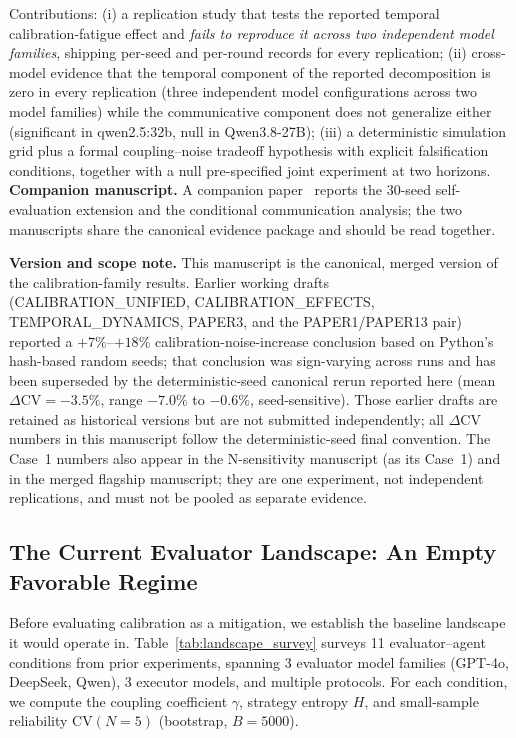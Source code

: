 \documentclass[11pt]{article}
\newcommand{\CV}{\ensuremath{\mathrm{CV}}}
\theoremstyle{definition}
\theoremstyle{remark}
\begin{document}
\noindent Contributions: (i) a replication study that tests the reported temporal calibration-fatigue effect and \emph{fails to reproduce it across two independent model families}, shipping per-seed and per-round records for every replication; (ii) cross-model evidence that the temporal component of the reported decomposition is zero in every replication (three independent model configurations across two model families) while the communicative component does not generalize either (significant in qwen2.5:32b, null in Qwen3.8-27B); (iii) a deterministic simulation grid plus a formal coupling--noise tradeoff hypothesis with explicit falsification conditions, together with a null pre-specified joint experiment at two horizons. \textbf{Companion manuscript.} A companion paper~\citep{companion2026} reports the 30-seed self-evaluation extension and the conditional communication analysis; the two manuscripts share the canonical evidence package and should be read together.

\textbf{Version and scope note.} This manuscript is the canonical, merged version of the calibration-family results. Earlier working drafts (CALIBRATION\_UNIFIED, CALIBRATION\_EFFECTS, TEMPORAL\_DYNAMICS, PAPER3, and the PAPER1/PAPER13 pair) reported a $+7\%$--$+18\%$ calibration-noise-increase conclusion based on Python's hash-based random seeds; that conclusion was sign-varying across runs and has been superseded by the deterministic-seed canonical rerun reported here (mean $\Delta\CV = -3.5\%$, range $-7.0\%$ to $-0.6\%$, seed-sensitive). Those earlier drafts are retained as historical versions but are not submitted independently; all $\Delta\CV$ numbers in this manuscript follow the deterministic-seed final convention. The Case~1 numbers also appear in the N-sensitivity manuscript (as its Case~1) and in the merged flagship manuscript; they are one experiment, not independent replications, and must not be pooled as separate evidence.

\subsection{The Current Evaluator Landscape: An Empty Favorable Regime}

Before evaluating calibration as a mitigation, we establish the baseline landscape it would operate in. Table~\ref{tab:landscape_survey} surveys 11 evaluator--agent conditions from prior experiments, spanning 3 evaluator model families (GPT-4o, DeepSeek, Qwen), 3 executor models, and multiple protocols. For each condition, we compute the coupling coefficient $\gamma$, strategy entropy $H$, and small-sample reliability $\CV(N{=}5)$ (bootstrap, $B{=}5000$).
\end{document}
